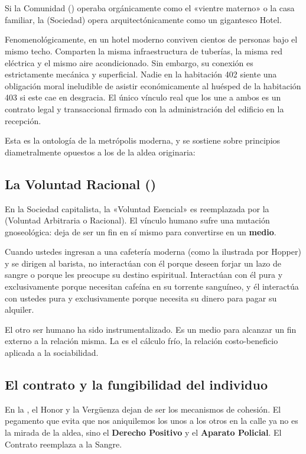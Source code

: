 \section{\Gesellschaft}

Si la Comunidad (\Gemeinschaft) operaba orgánicamente como el «vientre materno» o la casa familiar, la \textbf{\Gesellschaft} (Sociedad) opera arquitectónicamente como un gigantesco Hotel. 

Fenomenológicamente, en un hotel moderno conviven cientos de personas bajo el mismo techo. Comparten la misma infraestructura de tuberías, la misma red eléctrica y el mismo aire acondicionado. Sin embargo, su conexión es estrictamente mecánica y superficial. Nadie en la habitación 402 siente una obligación moral ineludible de asistir económicamente al huésped de la habitación 403 si este cae en desgracia. El único vínculo real que los une a ambos es un contrato legal y transaccional firmado con la administración del edificio en la recepción. 

Esta es la ontología de la metrópolis moderna, y se sostiene sobre principios diametralmente opuestos a los de la aldea originaria:

\subsection{La Voluntad Racional (\Kurwille)}
En la Sociedad capitalista, la «Voluntad Esencial» es reemplazada por la \textbf{\Kurwille} (Voluntad Arbitraria o Racional). El vínculo humano sufre una mutación gnoseológica: deja de ser un fin en sí mismo para convertirse en un \textbf{medio}. 

Cuando ustedes ingresan a una cafetería moderna (como la ilustrada por Hopper) y se dirigen al barista, no interactúan con él porque deseen forjar un lazo de sangre o porque les preocupe su destino espiritual. Interactúan con él pura y exclusivamente porque necesitan cafeína en su torrente sanguíneo, y él interactúa con ustedes pura y exclusivamente porque necesita su dinero para pagar su alquiler. 

El otro ser humano ha sido instrumentalizado. Es un medio para alcanzar un fin externo a la relación misma. La \Kurwille{} es el cálculo frío, la relación costo-beneficio aplicada a la sociabilidad. 

\subsection{El contrato y la fungibilidad del individuo}
En la \Gesellschaft, el Honor y la Vergüenza dejan de ser los mecanismos de cohesión. El pegamento que evita que nos aniquilemos los unos a los otros en la calle ya no es la mirada de la aldea, sino el \textbf{Derecho Positivo} y el \textbf{Aparato Policial}. El Contrato reemplaza a la Sangre. 

